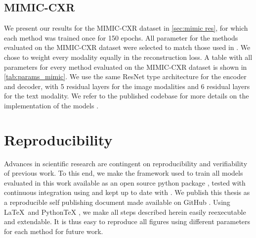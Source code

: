 
\subsection{MIMIC-CXR}
We present our results for the MIMIC-CXR dataset in \cref{sec:mimic res}, for which each method was trained once for 150 epochs.
All parameter for the methods evaluated on the MIMIC-CXR dataset were selected to match those used in \citep{klug_multimodal_nodate}.
We chose to weight every modality equally in the reconstruction loss.
A table with all parameters for every method evaluated on the MIMIC-CXR dataset is shown in \cref{tab:params_mimic}.
We use the same ResNet \citep{he2016deep} type architecture for the encoder and decoder, with 5 residual layers for the image modalities and 6 residual layers for the text modality.
We refer to the published codebase for more details on the implementation of the models \citep{mmvae_github}.




\section{Reproducibility}
Advances in scientific research are contingent on reproducibility and verifiability of previous work.
To this end, we make the framework used to train all models evaluated in this work available as an open source python package \citep{mmvae_github}, tested with continuous integration using \citep{travis} and kept up to date with \citep{dependabot}.
We publish this thesis as a reproducible self publishing document \citep[\href{https://github.com/TheChymera/RepSeP}{RepSeP}]{repsep} made available on GitHub \citep{mmnf_repsep}.
Using \LaTeX\ and PythonTeX \citep{pytex}, we make all steps described herein easily reexecutable and extendable.
It is thus easy to reproduce all figures using different parameters for each method for future work.